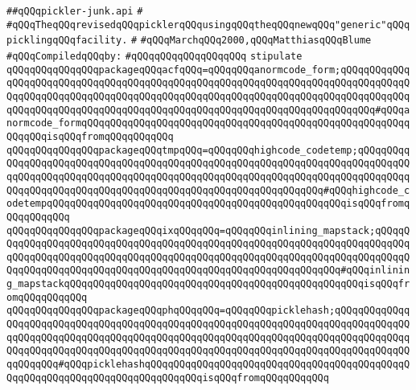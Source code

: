 \label{src/lib/compiler/front/semantic/pickle/pickler-junk.api}
\verb|##qQQqpickler-junk.api|\newline
\verb|#|\newline
\verb|#qQQqTheqQQqrevisedqQQqpicklerqQQqusingqQQqtheqQQqnewqQQq"generic"qQQqpicklingqQQqfacility.|\newline
\verb|#|\newline
\verb|#qQQqMarchqQQq2000,qQQqMatthiasqQQqBlume|\newline
\newline
\verb|#qQQqCompiledqQQqby:|\newline
\verb|#qQQqqQQqqQQqqQQqqQQq|\newline
\newline
\verb|stipulate|\newline
\verb|qQQqqQQqqQQqqQQqpackageqQQqacfqQQq=qQQqqQQqanormcode_form;qQQqqQQqqQQqqQQqqQQqqQQqqQQqqQQqqQQqqQQqqQQqqQQqqQQqqQQqqQQqqQQqqQQqqQQqqQQqqQQqqQQqqQQqqQQqqQQqqQQqqQQqqQQqqQQqqQQqqQQqqQQqqQQqqQQqqQQqqQQqqQQqqQQqqQQqqQQqqQQqqQQqqQQqqQQqqQQqqQQqqQQqqQQqqQQqqQQqqQQqqQQqqQQqqQQqqQQq#qQQqanormcode_formqQQqqQQqqQQqqQQqqQQqqQQqqQQqqQQqqQQqqQQqqQQqqQQqqQQqqQQqqQQqqQQqisqQQqfromqQQqqQQqqQQq|\newline
\verb|qQQqqQQqqQQqqQQqpackageqQQqtmpqQQq=qQQqqQQqhighcode_codetemp;qQQqqQQqqQQqqQQqqQQqqQQqqQQqqQQqqQQqqQQqqQQqqQQqqQQqqQQqqQQqqQQqqQQqqQQqqQQqqQQqqQQqqQQqqQQqqQQqqQQqqQQqqQQqqQQqqQQqqQQqqQQqqQQqqQQqqQQqqQQqqQQqqQQqqQQqqQQqqQQqqQQqqQQqqQQqqQQqqQQqqQQqqQQqqQQqqQQqqQQqqQQq#qQQqhighcode_codetempqQQqqQQqqQQqqQQqqQQqqQQqqQQqqQQqqQQqqQQqqQQqqQQqqQQqisqQQqfromqQQqqQQqqQQq|\newline
\verb|qQQqqQQqqQQqqQQqpackageqQQqixqQQqqQQq=qQQqqQQqinlining_mapstack;qQQqqQQqqQQqqQQqqQQqqQQqqQQqqQQqqQQqqQQqqQQqqQQqqQQqqQQqqQQqqQQqqQQqqQQqqQQqqQQqqQQqqQQqqQQqqQQqqQQqqQQqqQQqqQQqqQQqqQQqqQQqqQQqqQQqqQQqqQQqqQQqqQQqqQQqqQQqqQQqqQQqqQQqqQQqqQQqqQQqqQQqqQQqqQQqqQQqqQQqqQQq#qQQqinlining_mapstackqQQqqQQqqQQqqQQqqQQqqQQqqQQqqQQqqQQqqQQqqQQqqQQqqQQqisqQQqfromqQQqqQQqqQQq|\newline
\verb|qQQqqQQqqQQqqQQqpackageqQQqphqQQqqQQq=qQQqqQQqpicklehash;qQQqqQQqqQQqqQQqqQQqqQQqqQQqqQQqqQQqqQQqqQQqqQQqqQQqqQQqqQQqqQQqqQQqqQQqqQQqqQQqqQQqqQQqqQQqqQQqqQQqqQQqqQQqqQQqqQQqqQQqqQQqqQQqqQQqqQQqqQQqqQQqqQQqqQQqqQQqqQQqqQQqqQQqqQQqqQQqqQQqqQQqqQQqqQQqqQQqqQQqqQQqqQQqqQQqqQQqqQQqqQQqqQQqqQQq#qQQqpicklehashqQQqqQQqqQQqqQQqqQQqqQQqqQQqqQQqqQQqqQQqqQQqqQQqqQQqqQQqqQQqqQQqqQQqqQQqqQQqqQQqisqQQqfromqQQqqQQqqQQq|\newline
